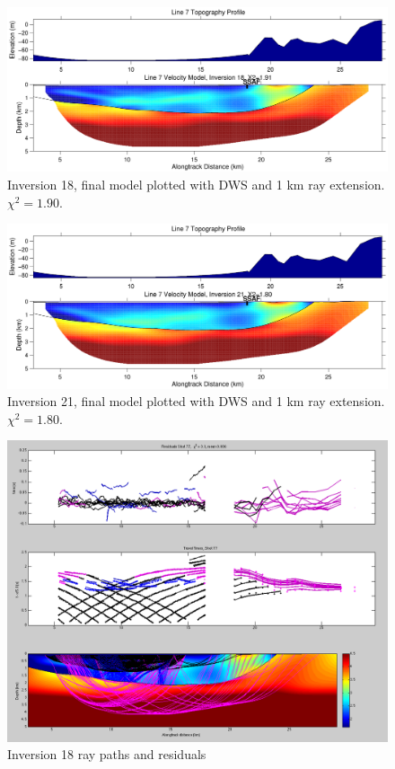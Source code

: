 \documentclass[fontsize=11pt, %
                             paper=a4, %
                             twoside, %
                             captions=tableheading,
                             index=totoc,
                             hyperref]{labbook}
\begin{document}
\begin{addmargin}[4cm]{0cm}
\begin{figure}[h!]
\raggedleft
\includegraphics[scale=0.6,keepaspectratio=true]{figs/interface_figures/inv18.pdf}
\caption{Inversion 18, final model plotted with DWS and 1 km ray extension.  $\chi^2 = 1.90$.}
\label{fig:inv18}
\end{figure} 

\begin{figure}[h!]
\raggedleft
\includegraphics[scale=0.6,keepaspectratio=true]{figs/interface_figures/inv21.pdf}
\caption{Inversion 21, final model plotted with DWS and 1 km ray extension.  $\chi^2 = 1.80$.}
\label{fig:inv21}
\end{figure}
 
\begin{figure}[h!]
\raggedleft
\includegraphics[scale=0.45,keepaspectratio=true]{figs/inv18finalRay.png}
\caption{Inversion 18 ray paths and residuals}
\label{fig:inv18ray}
\end{figure}


\end{addmargin}
\end{document}

